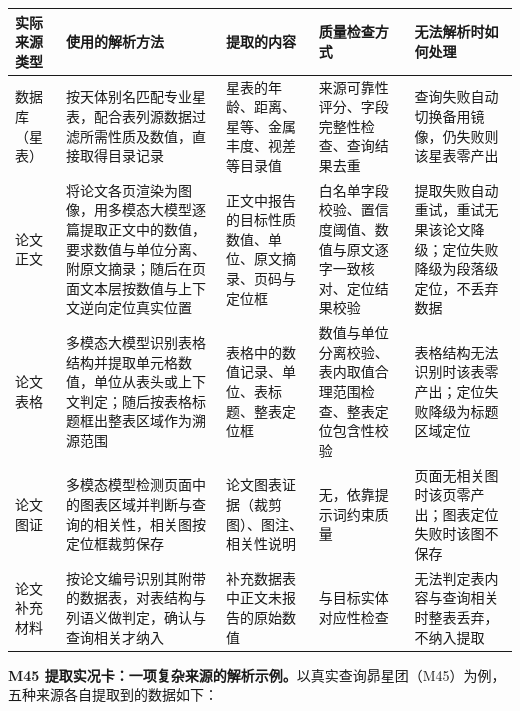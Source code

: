 \begin{longtable}{@{}p{2.2cm}p{5.2cm}p{2.8cm}p{2.2cm}p{2.2cm}@{}}
\toprule
实际来源类型 & 使用的解析方法 & 提取的内容 & 质量检查方式 & 无法解析时如何处理 \\
\midrule
数据库（星表） & 按天体别名匹配专业星表，配合表列源数据过滤所需性质及数值，直接取得目录记录 & 星表的年龄、距离、星等、金属丰度、视差等目录值 & 来源可靠性评分、字段完整性检查、查询结果去重 & 查询失败自动切换备用镜像，仍失败则该星表零产出 \\
论文正文 & 将论文各页渲染为图像，用多模态大模型逐篇提取正文中的数值，要求数值与单位分离、附原文摘录；随后在页面文本层按数值与上下文逆向定位真实位置 & 正文中报告的目标性质数值、单位、原文摘录、页码与定位框 & 白名单字段校验、置信度阈值、数值与原文逐字一致核对、定位结果校验 & 提取失败自动重试，重试无果该论文降级；定位失败降级为段落级定位，不丢弃数据 \\
论文表格 & 多模态大模型识别表格结构并提取单元格数值，单位从表头或上下文判定；随后按表格标题框出整表区域作为溯源范围 & 表格中的数值记录、单位、表标题、整表定位框 & 数值与单位分离校验、表内取值合理范围检查、整表定位包含性校验 & 表格结构无法识别时该表零产出；定位失败降级为标题区域定位 \\
论文图证 & 多模态模型检测页面中的图表区域并判断与查询的相关性，相关图按定位框裁剪保存 & 论文图表证据（裁剪图）、图注、相关性说明 & 无，依靠提示词约束质量 & 页面无相关图时该页零产出；图表定位失败时该图不保存 \\
论文补充材料 & 按论文编号识别其附带的数据表，对表结构与列语义做判定，确认与查询相关才纳入 & 补充数据表中正文未报告的原始数值 & 与目标实体对应性检查 & 无法判定表内容与查询相关时整表丢弃，不纳入提取 \\
\bottomrule
\end{longtable}

\noindent\textbf{M45 提取实况卡：一项复杂来源的解析示例。}以真实查询昴星团（M45）为例，五种来源各自提取到的数据如下：

